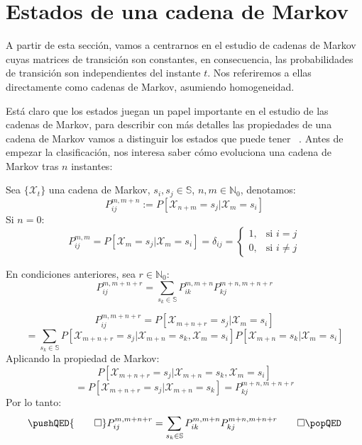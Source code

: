 \section{Estados de una cadena de Markov}
A partir de esta sección, vamos a centrarnos en el estudio de cadenas de Markov cuyas matrices de transición son constantes, en consecuencia, las probabilidades de transición son independientes del instante $t$. Nos referiremos a ellas directamente como cadenas de Markov, asumiendo homogeneidad. 

Está claro que los estados juegan un papel importante en el estudio de las cadenas de Markov, para describir con más detalles las propiedades de una cadena de Markov vamos a distinguir los estados que puede tener ~\cite{Barbosa}. Antes de empezar la clasificación, nos interesa saber cómo evoluciona una cadena de Markov tras $n$ instantes:


\begin{definition}
Sea $\{\mathcal{X}_t\}$ una cadena de Markov, $s_i, s_j \in \mathbb{S}$, $n,m\in\mathbb{N}_0$, denotamos:
\[P_{ij}^{m,m+n}:=P[\mathcal{X}_{n+m}=s_j|\mathcal{X}_m=s_i]\]
Si $n=0$:
\[P_{ij}^{m,m}=P[\mathcal{X}_{m}=s_j|\mathcal{X}_m=s_i]=\delta_{ij}=
\begin{cases}
    1, & \text{si } i=j\\
    0, &         \text{si } i\neq j
\end{cases}\]
\end{definition}
\begin{theorem}
En condiciones anteriores, sea $r\in \mathbb{N}_0$:
\[P_{ij}^{m,m+n+r}=\sum_{s_k\in\mathbb{S}}P_{ik}^{m,m+n}P_{kj}^{m+n,m+n+r}\]
\end{theorem}
\begin{proofs*}
    \[ P_{ij}^{m,m+n+r}=P[\mathcal{X}_{m+n+r}=s_j|\mathcal{X}_m=s_i]\]
    \[=\sum_{s_k\in\mathbb{S}} P[\mathcal{X}_{m+n+r}=s_j |\mathcal{X}_{m+n}=s_k,\mathcal{X}_m=s_i ] P[\mathcal{X}_{m+n}=s_k|\mathcal{X}_m=s_i ]\]
Aplicando la propiedad de Markov:
    \[P[\mathcal{X}_{m+n+r}=s_j |\mathcal{X}_{m+n}=s_k,\mathcal{X}_m=s_i ]\]\[=P[\mathcal{X}_{m+n+r}=s_j |\mathcal{X}_{m+n}=s_k]=P_{kj}^{m+n,m+n+r}\]
Por lo tanto:
    \[
    \pushQED{\qed}
    P_{ij}^{m,m+n+r}=\sum_{s_k\in\mathbb{S}}P_{ik}^{m,m+n}P_{kj}^{m+n,m+n+r}\qedhere
    \popQED\]
    
\end{proofs*}

